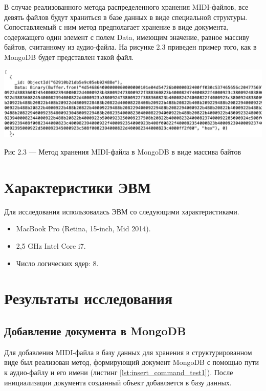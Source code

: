 В случае реализованного метода распределенного хранения MIDI-файлов, все девять файлов будут храниться в базе данных в виде специальной структуры. Сопоставляемый с ним метод предполагает хранение в виде документа, содержащего один элемент с полем Data, имеющим значение, равное массиву байтов, считанному из аудио-файла. На рисунке 2.3 приведен пример того, как в MongoDB будет представлен такой файл.

\begin{center}
		\includegraphics[scale=0.5]{tex/img/Bytes.png}
		
			Рис 2.3 — Метод хранения MIDI-файла в MongoDB в виде массива байтов
\end{center}

\section{Характеристики ЭВМ}

Для исследования использовалась ЭВМ со следующими характеристиками.
\begin{itemize}
	\item MacBook Pro (Retina, 15-inch, Mid 2014).
	\item 2,5 GHz Intel Core i7.
	\item Число логических ядер: 8.
\end{itemize}

\section{Результаты исследования}

\subsection{Добавление документа в MongoDB}

Для добавления MIDI-файла в базу данных для хранения в структурированном виде был реализован метод, формирующий документ MongoDB с помощью пути к аудио-файлу и его имени (листинг \ref{lst:insert_command_test1}). После инициализации документа созданный объект добавляется в базу данных.
 
